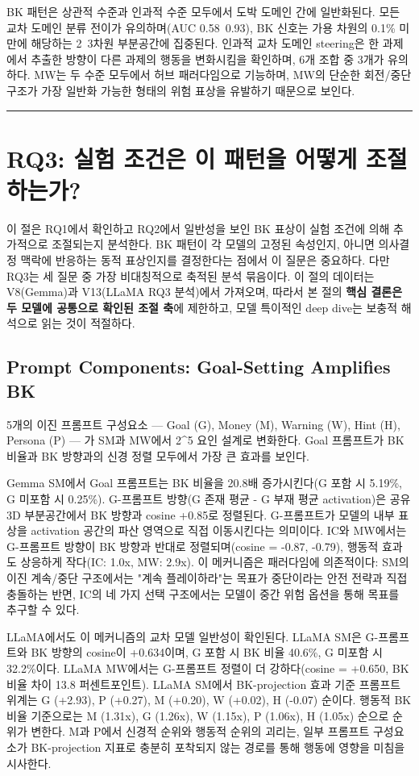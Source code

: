 \documentclass[11pt,a4paper]{article}
\begin{document}
BK 패턴은 상관적 수준과 인과적 수준 모두에서 도박 도메인 간에 일반화된다. 모든 교차 도메인 분류 전이가 유의하며(AUC 0.58~0.93), BK 신호는 가용 차원의 0.1\% 미만에 해당하는 2~3차원 부분공간에 집중된다. 인과적 교차 도메인 steering은 한 과제에서 추출한 방향이 다른 과제의 행동을 변화시킴을 확인하며, 6개 조합 중 3개가 유의하다. MW는 두 수준 모두에서 허브 패러다임으로 기능하며, MW의 단순한 회전/중단 구조가 가장 일반화 가능한 형태의 위험 표상을 유발하기 때문으로 보인다.

\bigskip\hrule\bigskip

\section{RQ3: 실험 조건은 이 패턴을 어떻게 조절하는가?}

이 절은 RQ1에서 확인하고 RQ2에서 일반성을 보인 BK 표상이 실험 조건에 의해 추가적으로 조절되는지 분석한다. BK 패턴이 각 모델의 고정된 속성인지, 아니면 의사결정 맥락에 반응하는 동적 표상인지를 결정한다는 점에서 이 질문은 중요하다. 다만 RQ3는 세 질문 중 가장 비대칭적으로 축적된 분석 묶음이다. 이 절의 데이터는 V8(Gemma)과 V13(LLaMA RQ3 분석)에서 가져오며, 따라서 본 절의 \textbf{핵심 결론은 두 모델에 공통으로 확인된 조절 축}에 제한하고, 모델 특이적인 deep dive는 보충적 해석으로 읽는 것이 적절하다.

\subsection{Prompt Components: Goal-Setting Amplifies BK}

5개의 이진 프롬프트 구성요소 --- Goal (G), Money (M), Warning (W), Hint (H), Persona (P) --- 가 SM과 MW에서 2^5 요인 설계로 변화한다. Goal 프롬프트가 BK 비율과 BK 방향과의 신경 정렬 모두에서 가장 큰 효과를 보인다.

Gemma SM에서 Goal 프롬프트는 BK 비율을 20.8배 증가시킨다(G 포함 시 5.19\%, G 미포함 시 0.25\%). G-프롬프트 방향(G 존재 평균 - G 부재 평균 activation)은 공유 3D 부분공간에서 BK 방향과 cosine +0.85로 정렬된다. G-프롬프트가 모델의 내부 표상을 activation 공간의 파산 영역으로 직접 이동시킨다는 의미이다. IC와 MW에서는 G-프롬프트 방향이 BK 방향과 반대로 정렬되며(cosine = -0.87, -0.79), 행동적 효과도 상응하게 작다(IC: 1.0x, MW: 2.9x). 이 메커니즘은 패러다임에 의존적이다: SM의 이진 계속/중단 구조에서는 "계속 플레이하라"는 목표가 중단이라는 안전 전략과 직접 충돌하는 반면, IC의 네 가지 선택 구조에서는 모델이 중간 위험 옵션을 통해 목표를 추구할 수 있다.

LLaMA에서도 이 메커니즘의 교차 모델 일반성이 확인된다. LLaMA SM은 G-프롬프트와 BK 방향의 cosine이 +0.634이며, G 포함 시 BK 비율 40.6\%, G 미포함 시 32.2\%이다. LLaMA MW에서는 G-프롬프트 정렬이 더 강하다(cosine = +0.650, BK 비율 차이 13.8 퍼센트포인트). LLaMA SM에서 BK-projection 효과 기준 프롬프트 위계는 G (+2.93), P (+0.27), M (+0.20), W (+0.02), H (-0.07) 순이다. 행동적 BK 비율 기준으로는 M (1.31x), G (1.26x), W (1.15x), P (1.06x), H (1.05x) 순으로 순위가 변한다. M과 P에서 신경적 순위와 행동적 순위의 괴리는, 일부 프롬프트 구성요소가 BK-projection 지표로 충분히 포착되지 않는 경로를 통해 행동에 영향을 미침을 시사한다.
\end{document}
